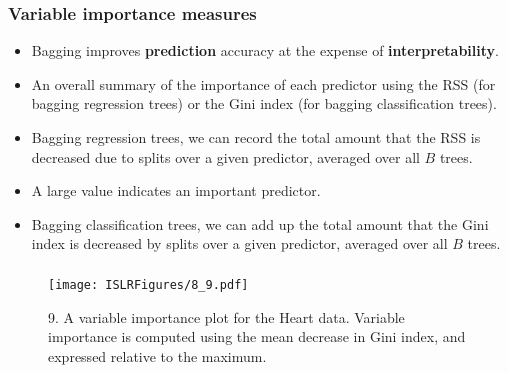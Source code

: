 \documentclass{beamer}
\begin{document}
              
                  \begin{frame}
                  	\frametitle{Variable importance measures  }
                  	\begin{itemize}
                  		\item Bagging improves {\bf prediction}
                  		accuracy at the expense of {\bf interpretability}.
                  	 	
                  	 	 
                  		\item  An overall summary of the importance of
                  		each predictor using the RSS (for bagging regression trees) or the Gini index
                  		(for bagging classification trees).
                  		\item Bagging regression trees, we
                  		can record the total amount that the RSS   is decreased due to splits
                  		over a given predictor, averaged over all $B$ trees.
                  		\item  A large value indicates
                  		an important predictor.
                  		\item Bagging classification
                  		trees, we can add up the total amount that the Gini index   is decreased
                  		by splits over a given predictor, averaged over all $B$ trees.
                  		
                  	\end{itemize}
                  \end{frame} 
              
                
                   \begin{frame}
                   	\frametitle{ }
                   	\begin{figure}
                   		\centering
                   		
                   		\centering
                   		\texttt{[image: ISLRFigures/8\_9.pdf]}
                   		\caption{\scriptsize 9. A variable importance plot for the Heart data. Variable importance
                   			is computed using the mean decrease in Gini index, and expressed relative
                   			to the maximum.
                   		}
                   	\end{figure}
                   \end{frame}
                     
\end{document}
